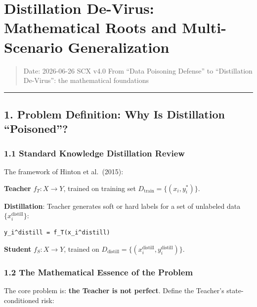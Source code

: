 \documentclass[
  12pt,
]{article}
\author{SCX}
\date{2026}
\begin{document}
\section{Distillation De-Virus: Mathematical Roots and Multi-Scenario Generalization}\label{distillation-de-virus-mathematical-roots-and-multi-scenario-generalization}

\begin{quote}
Date: 2026-06-26 \textbar{} SCX v4.0 \textbar{}
From ``Data Poisoning Defense'' to ``Distillation De-Virus'': the mathematical foundations
\end{quote}

\begin{center}\rule{0.5\linewidth}{0.5pt}\end{center}

\subsection{1. Problem Definition: Why Is Distillation ``Poisoned''?}\label{problem-definition-why-is-distillation-poisoned}

\subsubsection{1.1 Standard Knowledge Distillation Review}\label{standard-knowledge-distillation-review}

The framework of Hinton et al.~(2015):

\textbf{Teacher} $f_T: X \to Y$, trained on training set $D_{\text{train}} = \{(x_i, y_i^*)\}$.

\textbf{Distillation}: Teacher generates soft or hard labels for a set of unlabeled data $\{x_i^{\text{distill}}\}$:

\begin{verbatim}
y_i^distill = f_T(x_i^distill)
\end{verbatim}

\textbf{Student} $f_S: X \to Y$, trained on $D_{\text{distill}} = \{(x_i^{\text{distill}}, y_i^{\text{distill}})\}$.

\subsubsection{1.2 The Mathematical Essence of the Problem}\label{the-mathematical-essence-of-the-problem}

The core problem is: \textbf{the Teacher is not perfect}. Define the Teacher's state-conditioned risk:
\end{document}
